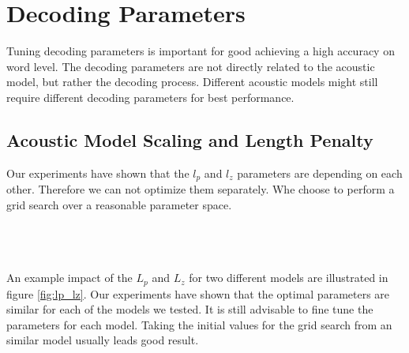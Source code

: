 \section{Decoding Parameters}
Tuning decoding parameters is important for good achieving a high accuracy on word level. The decoding parameters are not directly related to the acoustic model, but rather the decoding process. Different acoustic models might still require different decoding parameters for best performance. 
\subsection{Acoustic Model Scaling and Length Penalty}
Our experiments have shown that the $l_p$ and $l_z$ parameters are depending on each other. Therefore we can not optimize them separately. Whe choose to perform a grid search over a reasonable parameter space. \\ \\
\begin{minipage}{\linewidth}
\begin{minipage}{0.5\linewidth}
\end{minipage}
\hfill
\begin{minipage}{0.5\linewidth}
\end{minipage}
\label{fig:lp_lz}
\end{minipage}
\\ \\
An example impact of the $L_p$ and $L_z$ for two different models are illustrated in figure \ref{fig:lp_lz}. Our experiments have shown that the optimal parameters are similar for each of the models we tested. It is still advisable to fine tune the parameters for each model. Taking the initial values for the grid search from an similar model usually leads good result.
